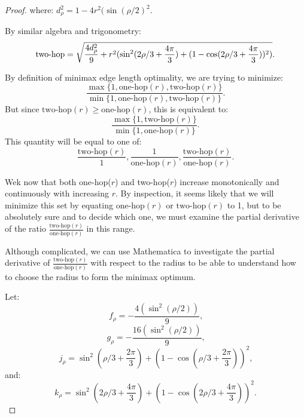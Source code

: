 \documentclass[twocolumn,10pt]{asme2ej}
\begin{document}
\begin{proof}
where: $  d_{\rho}^2 = 1 - 4 r^2 (\sin( \rho / 2)^2$.


By similar algebra and trigonometry:
\begin{equation}
  \text{two-hop}  = \sqrt{\frac{4 d_{\rho}^2}{9} +  r^2(\sin^2(2\rho/3 + \frac{4\pi}{3})  + (1 - \cos(2\rho/3 + \frac{4\pi}{3}))^2)} \text{.}\\
\end{equation}


By definition of minimax edge length optimality, we are trying to minimize:
\[
\frac{\max{\{1,\text{one-hop}(r),\text{two-hop}(r)}\}}{\min{\{1,\text{one-hop}(r),\text{two-hop}(r)}\}} \text{.}
\]
But since $\text{two-hop}(r) \geq \text{one-hop}(r)$, this is equivalent to:
\[
 \frac{   \max \{1,\text{two-hop}(r)\}}
      {   \min \{1,\text{one-hop}(r)\}} \text{.}
\]
This quantity will be equal to one of:
\begin{equation}
  \frac{\text{two-hop}(r)}{1},
\frac{1}{\text{one-hop}(r)},
\frac{\text{two-hop}(r)}{\text{one-hop}(r)} \text{.}
\label{eq:ratioset}
\end{equation}

Wek now that both one-hop($r$) and two-hop($r$) increase monotonically and continuously with increasing $r$.
By inspection, it seems likely that we will minimize this set by equating $\text{one-hop}(r)$ or $\text{two-hop}(r)$
to 1, but to be absolutely sure and to decide which one, we must examine the partial derivative of the ratio
 $\frac{\text{two-hop}(r)}{\text{one-hop}(r)}$ in this range.

Although complicated, we can use Mathematica to investigate
the partial derivative of $\frac{\text{two-hop}(r)}{\text{one-hop}(r)}$ with respect
to the radius to be able to understand how to choose the radius to form the minimax optimum.

Let:
\begin{equation}
  f_{\rho} = -\frac{4 (\sin^2( \rho / 2))}{9} \text{,}
  \end{equation}
\begin{equation}
  g_{\rho} = -\frac{16 (\sin^2( \rho / 2))}{9} \text{,}
\end{equation}
\begin{equation}
  j_{\rho} = \sin^2(\rho/3+ \frac{2\pi}{3})  + (1 - \cos(\rho/3 + \frac{2\pi}{3}))^2 \text{,}
\end{equation}
and:
\begin{equation}
  k_{\rho} = \sin^2(2\rho/3 + \frac{4\pi}{3})  + (1 - \cos(2\rho/3 + \frac{4\pi}{3}))^2 \text{.}
\end{equation}


\end{proof}
\end{document}
